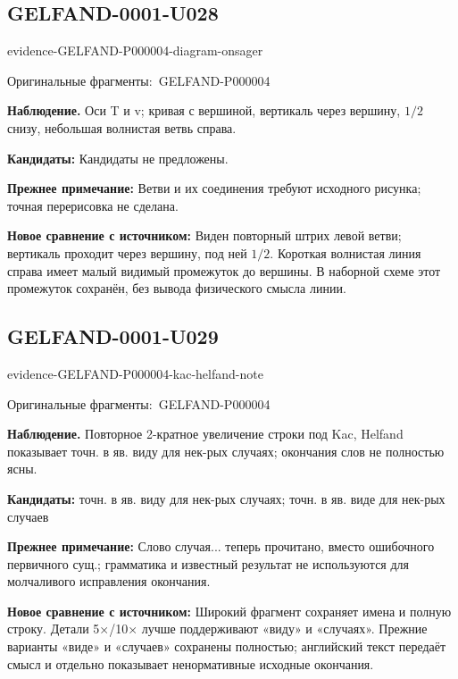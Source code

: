 \documentclass[11pt]{article}
\newcommand{\EvidenceBlock}[4]{%
 \par\smallskip\noindent\begin{minipage}{\linewidth}
 \begin{minipage}[t]{.47\linewidth}\vspace{0pt}\centering
 \csname evidence-#1-#2\endcsname\par
 {\scriptsize\SourceCropCaption\ #1}\par
 \end{minipage}\hfill
 \begin{minipage}[t]{.49\linewidth}\vspace{0pt}\raggedright
 {\small\color{orange!65!black}\textbf{#4} #3}\par
 \end{minipage}
 \end{minipage}\par\smallskip}
\newcommand{\SourceCropCaption}{Оригинальные фрагменты:}\newcommand{\ReadingCaption}{Сомнительное чтение.}\newcommand{\IncompleteCaption}{Неразобранный фрагмент.}\newcommand{\DiagramCaption}{Рисунок и набранное описание.}
\begin{document}
\subsection*{GELFAND-0001-U028}
\EvidenceBlock{GELFAND-P000004}{diagram-onsager}{Оси T и v; кривая с вершиной, вертикаль через вершину, \(1/2\) снизу, небольшая волнистая ветвь справа.}{Наблюдение.}
\par\smallskip\noindent\textbf{Кандидаты: } Кандидаты не предложены.\par
\par\smallskip\noindent\textbf{Прежнее примечание: } Ветви и их соединения требуют исходного рисунка; точная перерисовка не сделана.\par
\par\smallskip\noindent\textbf{Новое сравнение с источником: } Виден повторный штрих левой ветви; вертикаль проходит через вершину, под ней \(1/2\). Короткая волнистая линия справа имеет малый видимый промежуток до вершины. В наборной схеме этот промежуток сохранён, без вывода физического смысла линии.\par

\subsection*{GELFAND-0001-U029}
\EvidenceBlock{GELFAND-P000004}{kac-helfand-note}{Повторное 2-кратное увеличение строки под Kac, Helfand показывает точн. в яв. виду для нек-рых случаях; окончания слов не полностью ясны.}{Наблюдение.}
\par\smallskip\noindent\textbf{Кандидаты: } точн. в яв. виду для нек-рых случаях; точн. в яв. виде для нек-рых случаев\par
\par\smallskip\noindent\textbf{Прежнее примечание: } Слово случая... теперь прочитано, вместо ошибочного первичного сущ.; грамматика и известный результат не используются для молчаливого исправления окончания.\par
\par\smallskip\noindent\textbf{Новое сравнение с источником: } Широкий фрагмент сохраняет имена и полную строку. Детали 5×/10× лучше поддерживают «виду» и «случаях». Прежние варианты «виде» и «случаев» сохранены полностью; английский текст передаёт смысл и отдельно показывает ненормативные исходные окончания.\par
\end{document}

